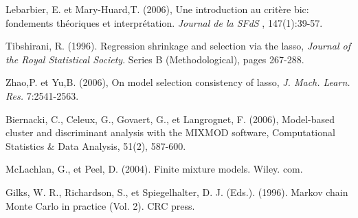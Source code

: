 \documentclass[12pt]{article}
\begin{document}
\noindent [3] Lebarbier, E. et Mary-Huard,T. (2006), Une introduction au critère bic: fondements
théoriques et interprétation.  {\it Journal de la SFdS }, 147(1):39-57.

\noindent[4] Tibshirani, R. (1996). Regression shrinkage and selection via the lasso,  {\it Journal of the Royal
Statistical Society}. Series B (Methodological), pages 267-288.

\noindent [5] Zhao,P. et Yu,B. (2006), On model selection consistency of lasso, {\it J. Mach. Learn.
Res.} 7:2541-2563.

\noindent [6] Biernacki, C., Celeux, G., Govaert, G., et Langrognet, F. (2006), Model-based cluster and discriminant analysis with the MIXMOD software, Computational Statistics \& Data Analysis, 51(2), 587-600.

\noindent [7] McLachlan, G., et Peel, D. (2004). Finite mixture models. Wiley. com.

\noindent [8] Gilks, W. R., Richardson, S., et Spiegelhalter, D. J. (Eds.). (1996). Markov chain Monte Carlo in practice (Vol. 2). CRC press.
%
%
%
\end{document}

